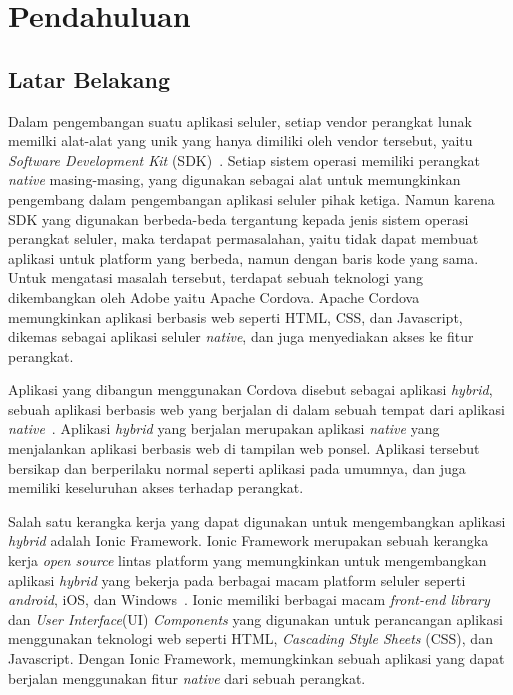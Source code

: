 \chapter{Pendahuluan}
\label{chap:intro}
   
\section{Latar Belakang}
\label{sec:label}

Dalam pengembangan suatu aplikasi seluler, setiap vendor perangkat lunak memilki alat-alat yang unik yang hanya dimiliki oleh vendor tersebut, yaitu \textit{Software Development Kit} (SDK)~\cite{yusuf:16:ionic}. Setiap sistem operasi memiliki perangkat \textit{native} masing-masing, yang digunakan sebagai alat untuk memungkinkan pengembang dalam pengembangan aplikasi seluler pihak ketiga. Namun karena SDK yang digunakan berbeda-beda tergantung kepada jenis sistem operasi perangkat seluler, maka terdapat permasalahan, yaitu tidak dapat membuat aplikasi untuk platform yang berbeda, namun dengan baris kode yang sama. Untuk mengatasi masalah tersebut, terdapat sebuah teknologi yang dikembangkan oleh Adobe yaitu Apache Cordova. Apache Cordova memungkinkan aplikasi berbasis web seperti HTML, CSS, dan Javascript, dikemas sebagai aplikasi seluler \textit{native}, dan juga menyediakan akses ke fitur perangkat.

Aplikasi yang dibangun menggunakan Cordova disebut sebagai aplikasi \textit{hybrid}, sebuah aplikasi berbasis web yang berjalan di dalam sebuah tempat dari aplikasi \textit{native}~\cite{yusuf:16:ionic}. Aplikasi \textit{hybrid} yang berjalan merupakan aplikasi \textit{native} yang menjalankan aplikasi berbasis web di tampilan web ponsel. Aplikasi tersebut bersikap dan berperilaku normal seperti aplikasi pada umumnya, dan juga memiliki keseluruhan akses terhadap perangkat. 

Salah satu kerangka kerja yang dapat digunakan untuk mengembangkan aplikasi \textit{hybrid} adalah Ionic Framework. Ionic Framework merupakan sebuah kerangka kerja {\it open source} lintas platform yang memungkinkan untuk mengembangkan aplikasi \textit{hybrid} yang bekerja pada berbagai macam platform seluler seperti {\it android}, iOS, dan Windows~\cite{waranashiwar:18:ionic}. Ionic memiliki berbagai macam \textit{front-end library} dan \textit{User Interface}(UI) {\it Components} yang digunakan untuk  perancangan aplikasi menggunakan teknologi web seperti HTML, {\it Cascading Style Sheets} (CSS), dan Javascript. Dengan Ionic Framework, memungkinkan sebuah aplikasi yang dapat berjalan menggunakan fitur \textit{native} dari sebuah perangkat.


